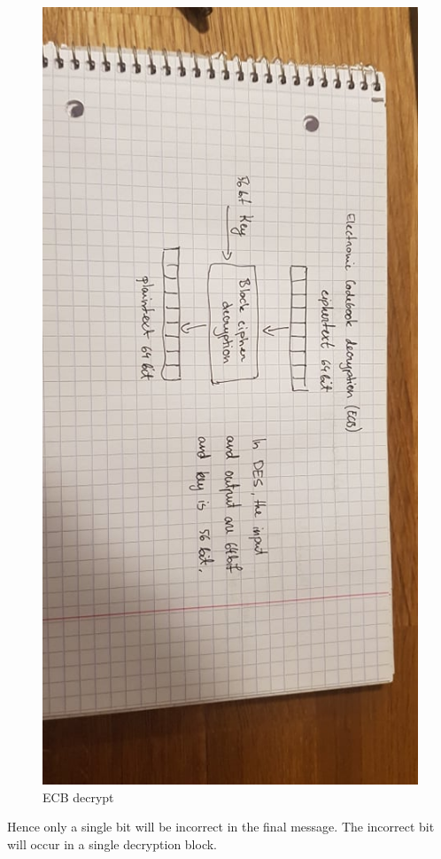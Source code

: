 \documentclass{article}
\begin{document}
\begin{figure}[H]
    \centering
    \label{fig:dh}
    \includegraphics[scale=0.5, angle=90]{ecb_decrypt.jpg}
    \caption{ECB decrypt}
\end{figure}
Hence only a single bit will be incorrect in the final message. The incorrect bit will occur in a single decryption block.
\\\\
\end{document}
